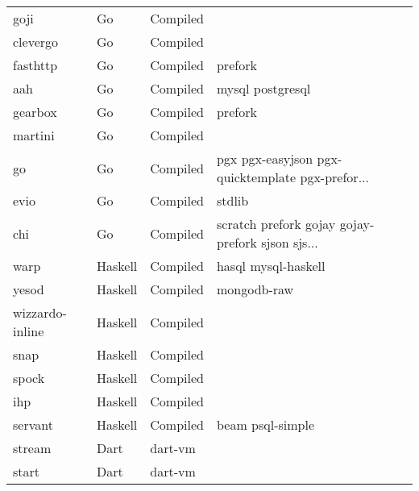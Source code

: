\begin{longtable}{llll}
    goji             & Go          & Compiled    &                                                    \\
    clevergo         & Go          & Compiled    &                                                    \\
    fasthttp         & Go          & Compiled    & prefork                                            \\
    aah              & Go          & Compiled    & mysql postgresql                                   \\
    gearbox          & Go          & Compiled    & prefork                                            \\
    martini          & Go          & Compiled    &                                                    \\
    go               & Go          & Compiled    & pgx pgx-easyjson pgx-quicktemplate pgx-prefor...   \\
    evio             & Go          & Compiled    & stdlib                                             \\
    chi              & Go          & Compiled    & scratch prefork gojay gojay-prefork sjson sjs...   \\
    warp             & Haskell     & Compiled    & hasql mysql-haskell                                \\
    yesod            & Haskell     & Compiled    & mongodb-raw                                        \\
    wizzardo-inline  & Haskell     & Compiled    &                                                    \\
    snap             & Haskell     & Compiled    &                                                    \\
    spock            & Haskell     & Compiled    &                                                    \\
    ihp              & Haskell     & Compiled    &                                                    \\
    servant          & Haskell     & Compiled    & beam psql-simple                                   \\
    stream           & Dart        & dart-vm     &                                                    \\
    start            & Dart        & dart-vm     &                                                    \\

\end{longtable}
